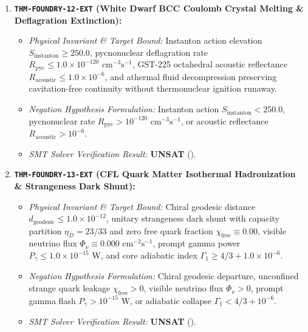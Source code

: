 \documentclass[11pt,onecolumn]{article}
\begin{document}
\begin{enumerate}
    \item \textbf{\texttt{THM-FOUNDRY-12-EXT} (White Dwarf BCC Coulomb Crystal Melting \& Deflagration Extinction):}
    \begin{itemize}
        \item \emph{Physical Invariant \& Target Bound:} Instanton action elevation $S_{\text{instanton}} \ge 250.0$, pycnonuclear deflagration rate $R_{\text{pyc}} \le 1.0 \times 10^{-120}\text{ cm}^{-3}\text{s}^{-1}$, GST-225 octahedral acoustic reflectance $R_{\text{acoustic}} \le 1.0 \times 10^{-6}$, and athermal fluid decompression preserving cavitation-free continuity without thermonuclear ignition runaway.
        \item \emph{Negation Hypothesis Formulation:} Instanton action $S_{\text{instanton}} < 250.0$, pycnonuclear rate $R_{\text{pyc}} > 10^{-120}\text{ cm}^{-3}\text{s}^{-1}$, or acoustic reflectance $R_{\text{acoustic}} > 10^{-6}$.
        \item \emph{SMT Solver Verification Result:} \textbf{UNSAT} ().
    \end{itemize}

    \item \textbf{\texttt{THM-FOUNDRY-13-EXT} (CFL Quark Matter Isothermal Hadronization \& Strangeness Dark Shunt):}
    \begin{itemize}
        \item \emph{Physical Invariant \& Target Bound:} Chiral geodesic distance $d_{\text{geodesic}} \le 1.0 \times 10^{-12}$, unitary strangeness dark shunt with capacity partition $\eta_D = 23/33$ and zero free quark fraction $\chi_{\text{free}} \equiv 0.00$, visible neutrino flux $\Phi_\nu \equiv 0.000\text{ cm}^{-2}\text{s}^{-1}$, prompt gamma power $P_\gamma \le 1.0 \times 10^{-15}\text{ W}$, and core adiabatic index $\Gamma_1 \ge 4/3 + 1.0 \times 10^{-6}$.
        \item \emph{Negation Hypothesis Formulation:} Chiral geodesic departure, unconfined strange quark leakage $\chi_{\text{free}} > 0$, visible neutrino flux $\Phi_\nu > 0$, prompt gamma flash $P_\gamma > 10^{-15}\text{ W}$, or adiabatic collapse $\Gamma_1 < 4/3 + 10^{-6}$.
        \item \emph{SMT Solver Verification Result:} \textbf{UNSAT} ().
    \end{itemize}


\end{enumerate}
\end{document}
